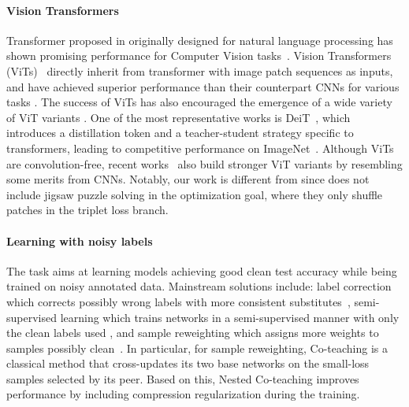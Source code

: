 \documentclass{article}
\begin{document}
\paragraph{Vision Transformers}
Transformer proposed in \cite{vaswani2017attention} originally designed for natural language processing has shown promising performance for Computer Vision tasks~\cite{dosovitskiy2021an,wu2021cvt,chen2021crossvit,li2022contextual}.
Vision Transformers (ViTs)~\cite{dosovitskiy2021an} directly inherit from transformer with image patch sequences as inputs, and have achieved superior performance than their counterpart CNNs for {various tasks \cite{he2021transreid,liu2021swin,strudel2021segmenter,yao2022dual}.
The success of ViTs has also encouraged the emergence of a wide variety of ViT variants \cite{touvron2021training,he2021masked,wu2021cvt,chen2021crossvit}.} 
One of the most representative works is DeiT~\cite{touvron2021training}, which introduces a distillation token and a teacher-student strategy specific to transformers, leading to competitive performance on ImageNet~\cite{deng2009imagenet}. 
{Although ViTs are convolution-free, recent works~\cite{li2022contextual,srinivas2021bottleneck,wang2021pyramid} also build stronger ViT variants by resembling some merits from CNNs.}
Notably, our work is different from \cite{he2021transreid} since \cite{he2021transreid} does not include jigsaw puzzle solving in the optimization goal, where they only shuffle patches in the triplet loss branch.

\paragraph{Learning with noisy labels}
The task aims at learning models achieving good clean test accuracy while being trained on noisy annotated data.
Mainstream solutions include: 
label correction which corrects possibly wrong labels with more consistent substitutes~\cite{tanaka2018joint,zhang2021learning}, 
semi-supervised learning which trains networks in a semi-supervised manner with only the clean labels used \cite{li2020dividemix}, and sample reweighting which assigns more weights to samples possibly clean~\cite{han2018co}.
In particular, for sample reweighting, Co-teaching \cite{han2018co} is a classical method that cross-updates its two base networks on the small-loss samples selected by its peer.
Based on this, Nested Co-teaching \cite{chen2022compressing} improves performance by including compression regularization during the training.
\end{document}
